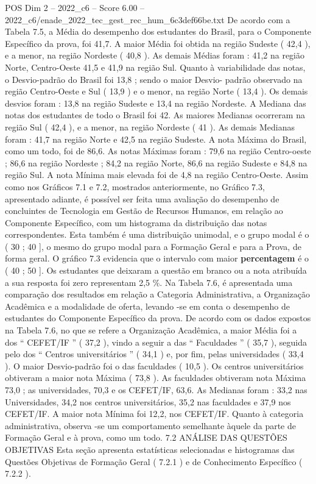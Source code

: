 \begin{textsample}{POS Dim 2 – 2022\_c6 – Score 6.00 – 2022\_c6/enade\_2022\_tec\_gest\_rec\_hum\_6c3def66be.txt}
De acordo com a Tabela 7.5, a Média do desempenho dos estudantes do Brasil, para o Componente Específico da prova, foi 41,7.
A maior Média foi obtida na região Sudeste ( 42,4 ), e a menor, na região Nordeste ( 40,8 ).
As demais Médias foram : 41,2 na região Norte, Centro-Oeste 41,5 e 41,9 na região Sul.
Quanto à variabilidade das notas, o Desvio-padrão do Brasil foi 13,8 ; sendo o maior Desvio- padrão observado na região Centro-Oeste e Sul ( 13,9 ) e o menor, na região Norte ( 13,4 ).
Os demais desvios foram : 13,8 na região Sudeste e 13,4 na região Nordeste.
A Mediana das notas dos estudantes de todo o Brasil foi 42.
As maiores Medianas ocorreram na região Sul ( 42,4 ), e a menor, na região Nordeste ( 41 ).
As demais Medianas foram : 41,7 na região Norte e 42,5 na região Sudeste.
A nota Máxima do Brasil, como um todo, foi de 86,6.
As notas Máximas foram : 79,6 na região Centro-oeste ; 86,6 na região Nordeste ; 84,2 na região Norte, 86,6 na região Sudeste e 84,8 na região Sul.
A nota Mínima mais elevada foi de 4,8 na região Centro-Oeste.
Assim como nos Gráficos 7.1 e 7.2, mostrados anteriormente, no Gráfico 7.3, apresentado adiante, é possível ser feita uma avaliação do desempenho de concluintes de Tecnologia em Gestão de Recursos Humanos, em relação ao Componente Específico, com um histograma da distribuição das notas correspondentes.
Esta também é uma distribuição unimodal, e o grupo modal é o ( 30 ; 40 ], o mesmo do grupo modal para a Formação Geral e para a Prova, de forma geral.
O gráfico 7.3 evidencia que o intervalo com maior \textbf{percentagem} é o ( 40 ; 50 ].
Os estudantes que deixaram a questão em branco ou a nota atribuída a sua resposta foi zero representam 2,5 \%.
Na Tabela 7.6, é apresentada uma comparação dos resultados em relação a Categoria Administrativa, a Organização Acadêmica e a modalidade de oferta, levando -se em conta o desempenho de estudantes do Componente Específico da prova.
De acordo com os dados expostos na Tabela 7.6, no que se refere a Organização Acadêmica, a maior Média foi a dos “ CEFET/IF ” ( 37,2 ), vindo a seguir a das “ Faculdades ” ( 35,7 ), seguida pelo dos “ Centros universitários ” ( 34,1 ) e, por fim, pelas universidades ( 33,4 ).
O maior Desvio-padrão foi o das faculdades ( 10,5 ).
Os centros universitários obtiveram a maior nota Máxima ( 73,8 ).
As faculdades obtiveram nota Máxima 73,0 ; as universidades, 70,3 e os CEFET/IF, 63,6.
As Medianas foram : 33,2 nas Universidades, 34,2 nos centros universitários, 35,2 nas faculdades e 37,9 nos CEFET/IF.
A maior nota Mínima foi 12,2, nos CEFET/IF.
Quanto à categoria administrativa, observa -se um comportamento semelhante àquele da parte de Formação Geral e à prova, como um todo. 7.2 ANÁLISE DAS QUESTÕES OBJETIVAS Esta seção apresenta estatísticas selecionadas e histogramas das Questões Objetivas de Formação Geral ( 7.2.1 ) e de Conhecimento Específico ( 7.2.2 ).

\end{textsample}
